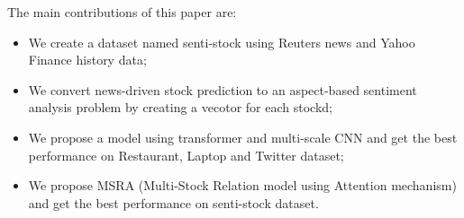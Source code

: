 \begin{eabstract}
  The main contributions of this paper are:
  \begin{itemize}
  	\item
  	We create a dataset named senti-stock using Reuters news and Yahoo Finance history data;
  	\item We convert news-driven stock prediction to an aspect-based sentiment analysis problem by creating a vecotor for each stockd;
  	\item We propose a model using transformer and multi-scale CNN and get the best performance on Restaurant, Laptop and Twitter dataset;
  	\item We propose MSRA (Multi-Stock Relation model using Attention mechanism) and get the best performance on senti-stock dataset.
  \end{itemize}
\end{eabstract}

